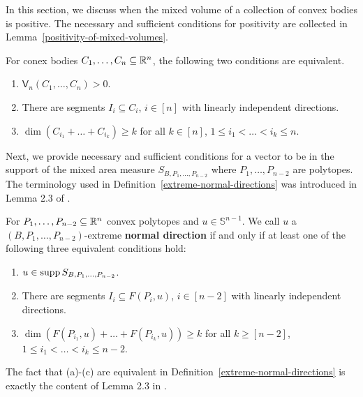 \documentclass{puthesis-UG}
\begin{document}
In this section, we discuss when the mixed volume of a collection of convex bodies is positive. The necessary and sufficient conditions for positivity are collected in Lemma~\ref{positivity-of-mixed-volumes}. 

\begin{lem} \label{positivity-of-mixed-volumes}
	For conex bodies $C_1, \ldots, C_n \subseteq \mathbb{R}^n$, the following two conditions are equivalent.
	\begin{enumerate}[label = (\alph*)]
		\item $\mathsf{V}_n (C_1, \ldots, C_n) > 0$. 
		\item There are segments $I_i \subseteq C_i$, $i \in [n]$ with linearly independent directions. 
		\item $\dim (C_{i_1} + \ldots + C_{i_k}) \geq k$ for all $k \in [n]$, $1 \leq i_1 < \ldots < i_k \leq n$. 
	\end{enumerate}
\end{lem}

Next, we provide necessary and sufficient conditions for a vector to be in the support of the mixed area measure $S_{B, P_1, \ldots, P_{n-2}}$ where $P_1, \ldots, P_{n-2}$ are polytopes. The terminology used in Definition~\ref{extreme-normal-directions} was introduced in Lemma 2.3 of \cite{shenfeld2022extremals}. 

\begin{defn} \label{extreme-normal-directions}
	For $P_1, \ldots, P_{n-2} \subseteq \mathbb{R}^n$ convex polytopes and $u \in \mathbb{S}^{n-1}$. We call $u$ a $(B, P_1, \ldots, P_{n-2})$-extreme \textbf{normal direction} if and only if at least one of the following three equivalent conditions hold:
	\begin{enumerate}[label = (\alph*)]
		\item $u \in \operatorname{supp} S_{B, P_1, \ldots, P_{n-2}}$. 
		\item There are segments $I_i \subseteq F (P_i, u)$, $i \in [n-2]$ with linearly independent directions. 
		\item $\dim(F(P_{i_1}, u) + \ldots + F(P_{i_k}, u)) \geq k$ for all $k \geq [n-2]$, $1 \leq i_1 < \ldots < i_k \leq n-2$. 
	\end{enumerate}
\end{defn}

The fact that (a)-(c) are equivalent in Definition~\ref{extreme-normal-directions} is exactly the content of Lemma 2.3 in \cite{shenfeld2022extremals}. 
\end{document}
